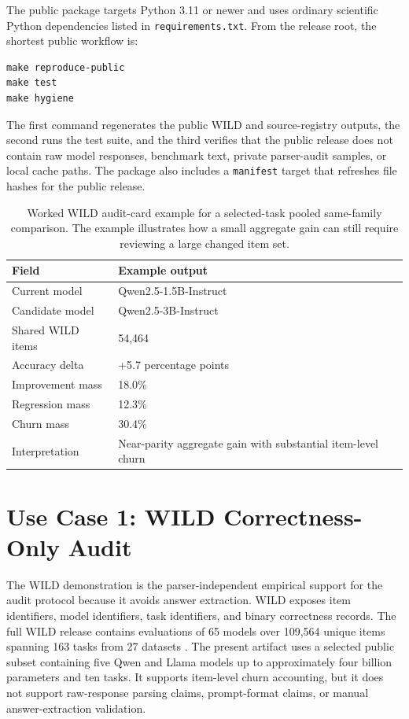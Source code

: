 \documentclass[manuscript, screen, review, nonacm]{jair}
\begin{document}
The public package targets Python 3.11 or newer and uses ordinary scientific Python dependencies listed in \texttt{requirements.txt}. From the release root, the shortest public workflow is:

\begin{verbatim}
make reproduce-public
make test
make hygiene
\end{verbatim}

The first command regenerates the public WILD and source-registry outputs, the second runs the test suite, and the third verifies that the public release does not contain raw model responses, benchmark text, private parser-audit samples, or local cache paths. The package also includes a \texttt{manifest} target that refreshes file hashes for the public release.

\begin{table}[t]
\centering
\small
\begin{tabular}{ll}
\toprule
Field & Example output \\
\midrule
Current model & Qwen2.5-1.5B-Instruct \\
Candidate model & Qwen2.5-3B-Instruct \\
Shared WILD items & 54,464 \\
Accuracy delta & +5.7 percentage points \\
Improvement mass & 18.0\% \\
Regression mass & 12.3\% \\
Churn mass & 30.4\% \\
Interpretation & Near-parity aggregate gain with substantial item-level churn \\
\bottomrule
\end{tabular}
\caption{Worked WILD audit-card example for a selected-task pooled same-family comparison. The example illustrates how a small aggregate gain can still require reviewing a large changed item set.}
\label{tab:worked-audit-card}
\end{table}

\section{Use Case 1: WILD Correctness-Only Audit}

The WILD demonstration is the parser-independent empirical support for the audit protocol because it avoids answer extraction. WILD exposes item identifiers, model identifiers, task identifiers, and binary correctness records. The full WILD release contains evaluations of 65 models over 109,564 unique items spanning 163 tasks from 27 datasets \parencite{krumdick2026wild}. The present artifact uses a selected public subset containing five Qwen and Llama models up to approximately four billion parameters and ten tasks. It supports item-level churn accounting, but it does not support raw-response parsing claims, prompt-format claims, or manual answer-extraction validation.
\end{document}
